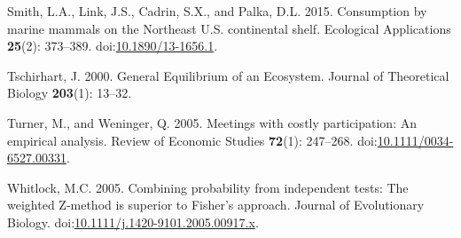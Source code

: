 \documentclass[]{article}
\begin{document}
\hypertarget{ref-smith_consumption_2015}{}
Smith, L.A., Link, J.S., Cadrin, S.X., and Palka, D.L. 2015. Consumption
by marine mammals on the Northeast U.S. continental shelf. Ecological
Applications \textbf{25}(2): 373--389.
doi:\href{https://doi.org/10.1890/13-1656.1}{10.1890/13-1656.1}.

\hypertarget{ref-Tschirhart2000GeneralEcosystem}{}
Tschirhart, J. 2000. General Equilibrium of an Ecosystem. Journal of
Theoretical Biology \textbf{203}(1): 13--32.

\hypertarget{ref-Turner2005MeetingsAnalysis}{}
Turner, M., and Weninger, Q. 2005. Meetings with costly participation:
An empirical analysis. Review of Economic Studies \textbf{72}(1):
247--268.
doi:\href{https://doi.org/10.1111/0034-6527.00331}{10.1111/0034-6527.00331}.

\hypertarget{ref-Whitlock2005CombiningApproach}{}
Whitlock, M.C. 2005. Combining probability from independent tests: The
weighted Z-method is superior to Fisher's approach. Journal of
Evolutionary Biology.
doi:\href{https://doi.org/10.1111/j.1420-9101.2005.00917.x}{10.1111/j.1420-9101.2005.00917.x}.
\end{document}

